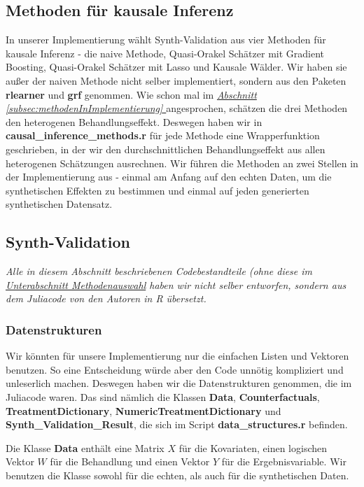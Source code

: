 \documentclass[12pt,a4paper,twoside]{scrartcl}
\numberwithin{equation}{section}
\newcommand{\refsec}[1]{\emph{\hyperref[#1]{Abschnitt \ref*{#1} }}}
\begin{document}
  	\subsection{Methoden für kausale Inferenz}\label{subsec:methodenKausaleInferenz}
  	In unserer Implementierung wählt  Synth-Validation aus vier Methoden für kausale Inferenz - die naive Methode, Quasi-Orakel Schätzer mit Gradient Boosting, Quasi-Orakel Schätzer mit Lasso und Kausale Wälder. Wir haben sie außer der naiven Methode nicht selber implementiert, sondern aus den Paketen \textbf{rlearner} und  \textbf{grf} genommen. Wie schon mal im \refsec{subsec:methodenInImplementierung} angesprochen, schätzen die drei Methoden den heterogenen Behandlungseffekt. Deswegen haben wir in \textbf{causal\_inference\_methods.r} für jede Methode eine Wrapperfunktion geschrieben, in der wir den durchschnittlichen Behandlungseffekt aus allen heterogenen Schätzungen ausrechnen. Wir führen die Methoden an zwei Stellen in der Implementierung aus - einmal am Anfang auf den echten Daten, um die synthetischen Effekten zu bestimmen und einmal auf jeden generierten synthetischen Datensatz. \par
\subsection{Synth-Validation}\label{subsec:synthValidation}
\noindent
\emph{Alle in diesem Abschnitt beschriebenen Codebestandteile (ohne diese im  \emph{\hyperref[subsubsec:methodenauswahl]{Unterabschnitt Methodenauswahl}} haben wir nicht selber entworfen, sondern aus dem Juliacode von den Autoren in R übersetzt.} \par
\subsubsection{Datenstrukturen}\label{subsubsec:datenstrukturen}

Wir könnten für unsere Implementierung nur die einfachen Listen und Vektoren benutzen. So eine Entscheidung würde aber den Code unnötig kompliziert und unleserlich machen. Deswegen haben wir die Datenstrukturen genommen, die im Juliacode waren. Das sind nämlich die Klassen \textbf{Data}, \textbf{Counterfactuals}, \textbf{TreatmentDictionary}, \textbf{NumericTreatmentDictionary} und \textbf{Synth\_Validation\_Result}, die sich im Script \textbf{data\_structures.r} befinden.\par 

\noindent
Die Klasse \textbf{Data} enthält  eine Matrix $X$ für die Kovariaten, einen logischen Vektor $W$ für die Behandlung und einen Vektor $Y$ für die Ergebnisvariable. Wir benutzen die Klasse sowohl für die echten, als auch für die synthetischen Daten.\par 
\end{document}
